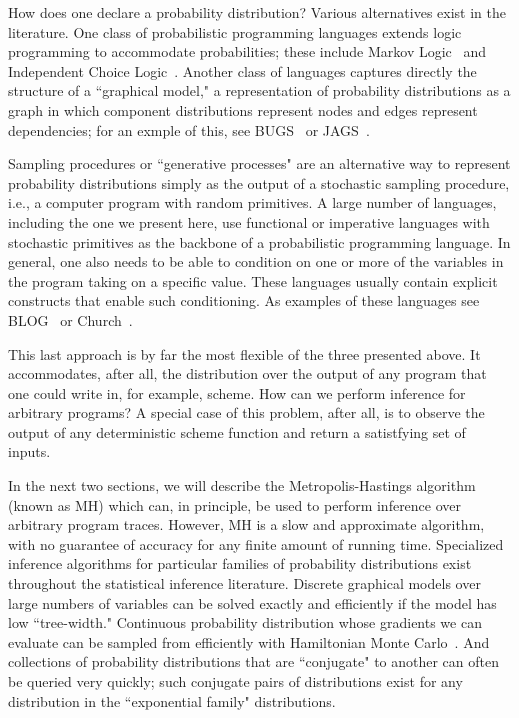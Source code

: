 \documentclass{article}
\begin{document}
How does one declare a probability distribution? Various alternatives exist in
the literature. One class of probabilistic programming languages extends logic
programming to accommodate probabilities; these include Markov
Logic~\cite{richardson2006markov} and Independent Choice
Logic~\cite{poole1997independent}. Another class of languages captures directly
the structure of a ``graphical model," a representation of probability
distributions as a graph in which component distributions represent nodes and
edges represent dependencies; for an exmple of this, see
BUGS~\cite{lunn2000winbugs} or JAGS~\cite{plummer2003jags}. 

Sampling procedures or ``generative processes" are an alternative way to
represent probability distributions simply as the output of a stochastic
sampling procedure, i.e., a computer program with random primitives. A large
number of languages, including the one we present here, use functional or
imperative languages with stochastic primitives as the backbone of a
probabilistic programming language. In general, one also needs to be able to
condition on one or more of the variables in
the program taking on a specific value. These languages usually contain explicit
constructs that enable such conditioning. As examples of these languages see
BLOG~\cite{milch20071} or Church~\cite{goodman2012church}.

This last approach is by far the most flexible of the three presented above. It
accommodates, after all, the distribution over the output of any program that one
could write in, for example, scheme. How can we perform inference for arbitrary
programs? A special case of this problem, after all, is to observe the output of
any deterministic scheme function and return a satistfying set of inputs.

In the next two sections, we will describe the Metropolis-Hastings algorithm
(known as MH) which can, in principle, be used to perform inference over
arbitrary program traces. However, MH is a slow and approximate algorithm, with
no guarantee of accuracy for any finite amount of running time. Specialized
inference algorithms for particular families of probability distributions exist
throughout the statistical inference literature. Discrete graphical models over
large numbers of variables can be solved exactly and efficiently if the model
has low ``tree-width." Continuous probability distribution whose gradients we can
evaluate can be sampled from efficiently with Hamiltonian Monte Carlo~\cite{duane1987hybrid}.
And collections of probability distributions that are ``conjugate" to another
can often be queried very quickly; such conjugate pairs of distributions exist
for any distribution in the ``exponential family" distributions.
\end{document}
